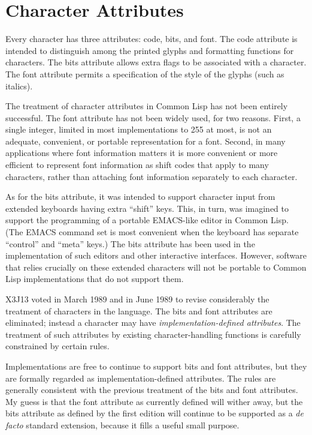 \section{Character Attributes}

Every character has three attributes: code, bits, and font.
The code attribute is intended to distinguish among the printed glyphs
and formatting functions for characters.  The bits attribute allows extra
flags to be associated with a character.  The font attribute permits
a specification of the style of the glyphs (such as italics).

\begin{new}
The treatment of character attributes in Common Lisp has not been
entirely successful.  The font attribute has not been widely used,
for two reasons.  First, a single integer, limited in most
implementations to 255 at most, is not an adequate, convenient, or portable
representation for a font.  Second, in many applications where font
information matters it is more convenient or more efficient to represent
font information as shift codes that apply to many characters, rather than
attaching font information separately to each character.

As for the bits attribute, it was intended to support
character input from extended keyboards having extra ``shift'' keys.
This, in turn, was imagined to support the programming of a portable
EMACS-like editor in Common Lisp.  (The EMACS command set
is most convenient when the keyboard has separate ``control'' and
``meta'' keys.)   The bits attribute has been used in the implementation
of such editors and other interactive interfaces.  However, software
that relies crucially on these extended characters will not be portable
to Common Lisp implementations that do not support them.

X3J13 voted in March 1989 
and in June 1989 
to revise considerably the treatment
of characters in the language.  The bits and font attributes are eliminated;
instead a character may have \emph{implementation-defined attributes}.
The treatment of such attributes by existing character-handling functions
is carefully constrained by certain rules.

Implementations are free to
continue to support bits and font attributes, but they are
formally regarded as implementation-defined attributes.
The rules are generally consistent with the previous
treatment of the bits and font attributes.
My guess is that
the font attribute as currently defined will wither away,
but the bits attribute as defined by the first edition will
continue to be supported as a \emph{de facto} standard extension,
because it fills a useful small purpose.
\end{new}


